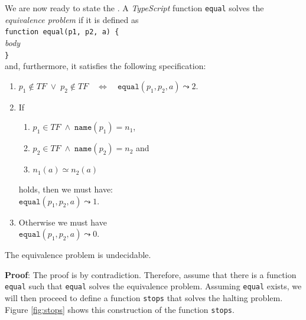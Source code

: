 \noindent
We are now ready to state the .
A \textsl{TypeScript} function \texttt{equal} solves the
\emph{equivalence problem}  if it is defined as
\\[0.2cm]
\hspace*{1.3cm} \texttt{function equal(p1, p2, a) \{}               \\
\hspace*{2.1cm} \textsl{body}                                \\[0.2cm]
\hspace*{1.3cm} \texttt{\}}                                \\[0.2cm]
and, furthermore, it satisfies the following specification:

\begin{enumerate}
\item $p_1 \not\in T\!F \;\vee\; p_2 \not\in T\!F \quad\Leftrightarrow\quad \mathtt{equal}(p_1, p_2, a) \leadsto 2$.
\item If 
      \begin{enumerate}
      \item $p_1 \in T\!F \;\wedge\; \mathtt{name}(p_1) = n_1$,
      \item $p_2 \in T\!F \;\wedge\; \mathtt{name}(p_2) = n_2$ \quad and
      \item $n_1(a) \simeq n_2(a)$
      \end{enumerate}
      holds, then we must have: 
      \\[0.2cm]
      \hspace*{1.3cm} 
      $\mathtt{equal}(p_1, p_2, a) \leadsto 1$.
\item Otherwise we must have \\[0.2cm]
      \hspace*{1.3cm} 
      $\mathtt{equal}(p_1, p_2, a) \leadsto 0$.
\end{enumerate}


\begin{Theorem}
The equivalence problem is undecidable.  
\end{Theorem}

\noindent
\textbf{Proof}:
The proof is by contradiction.
Therefore, assume that there is a function \texttt{equal}
such that \texttt{equal} solves the equivalence problem.
Assuming \texttt{equal} exists, we will
then proceed to define a function \texttt{stops} that solves the halting problem.
Figure \ref{fig:stops} shows this construction of the function \texttt{stops}.

